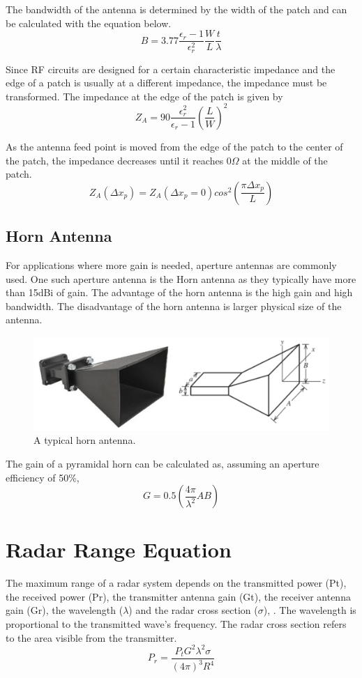 The bandwidth of the antenna is determined by the width of the patch and can be calculated with the equation below.
    \[B=3.77\frac{\epsilon_{r}-1}{\epsilon_{r}^{2}}\frac{W}{L}\frac{t}{\lambda}\]

Since RF circuits are designed for a certain characteristic impedance and the edge of a patch is usually at a different impedance, the impedance must be transformed. The impedance at the edge of the patch is given by
    \[Z_{A}=90\frac{\epsilon_{r}^{2}}{\epsilon_{r}-1}\left( \frac{L}{W} \right)^{2}\]

As the antenna feed point is moved from the edge of the patch to the center of the patch, the impedance decreases until it reaches 0$\Omega$ at the middle of the patch.
    \[Z_{A}\left( \Delta x_{p} \right)=Z_{A}\left( \Delta x_{p}=0 \right)cos^{2}\left( \frac{\pi\Delta x_{p}}{L} \right)\]

\subsection{Horn Antenna}
For applications where more gain is needed, aperture antennas are commonly used. One such aperture antenna is the Horn antenna as they typically have more than 15dBi of gain. The advantage of the horn antenna is the high gain and high bandwidth. The disadvantage of the horn antenna is larger physical size of the antenna.

    \begin{figure}[H]
    \centering
    \includegraphics[width=0.6\linewidth]{Figures/chp2_Horn.png}
    \caption{A typical horn antenna.}
    \label{fig:chp2_Horn}
    \end{figure}

The gain of a pyramidal horn can be calculated as, assuming an aperture efficiency of 50\%, \cite{Horn}
    \[G=0.5\left( \frac{4\pi}{\lambda^{2}}AB \right)\]

\section{Radar Range Equation}
The maximum range of a radar system depends on the transmitted power (Pt), the received power (Pr), the transmitter antenna gain (Gt), the receiver antenna gain (Gr), the wavelength ($\lambda$) and the radar cross section ($\sigma$), \cite{Farfield}. The wavelength is proportional to the transmitted wave’s frequency. The radar cross section refers to the area visible from the transmitter. 
    \[P_{r}=\frac{P_{t}G^{2}\lambda^{2}\sigma}{\left( 4\pi \right)^{3}R^{4}}\]


